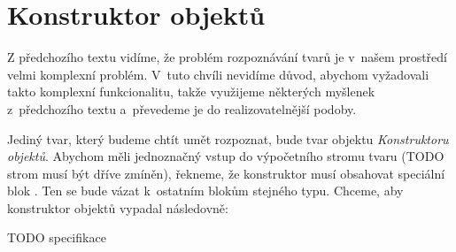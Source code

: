 
\section{Konstruktor objektů}
\label{sec:konstruktor}


Z předchozího textu vidíme, že problém rozpoznávání tvarů je v~našem prostředí velmi komplexní problém. V~tuto chvíli nevidíme důvod, abychom vyžadovali takto komplexní funkcionalitu, takže využijeme některých myšlenek z~předchozího textu a~převedeme je do realizovatelnější podoby.

Jediný tvar, který budeme chtít umět rozpoznat, bude tvar objektu \textit{Konstruktoru objektů}. Abychom měli jednoznačný vstup do výpočetního stromu tvaru (TODO strom musí být dříve zmíněn), řekneme, že konstruktor musí obsahovat speciální blok . Ten se bude vázat k~ostatním blokům stejného typu. Chceme, aby konstruktor objektů vypadal následovně:

TODO specifikace

